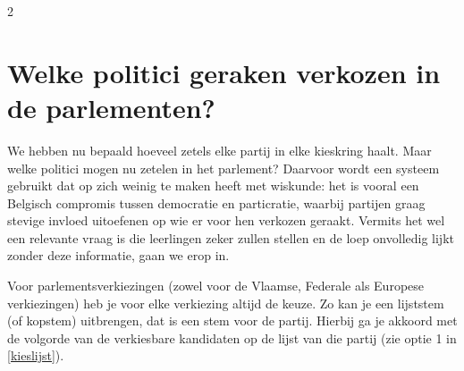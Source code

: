\begin{multicols}{2}
\section{Welke politici geraken verkozen in de parlementen?}
We hebben nu bepaald hoeveel zetels elke partij in elke kieskring haalt. Maar welke politici mogen nu zetelen in het parlement? Daarvoor wordt een systeem gebruikt dat op zich weinig te maken heeft met wiskunde: het is vooral een Belgisch compromis tussen democratie en particratie, waarbij partijen graag stevige invloed uitoefenen op wie er voor hen verkozen geraakt. Vermits het wel een relevante vraag is die leerlingen zeker zullen stellen en de loep onvolledig lijkt zonder deze informatie, gaan we erop in.

Voor parlementsverkiezingen (zowel voor de Vlaamse, Federale als Europese verkiezingen) heb je voor elke verkiezing altijd de keuze. Zo kan je een lijststem (of kopstem) uitbrengen, dat is een stem voor de partij.  Hierbij ga je akkoord met de volgorde van de verkiesbare kandidaten op de lijst van die partij (zie optie 1 in \autoref{kieslijst}).
\end{multicols}

